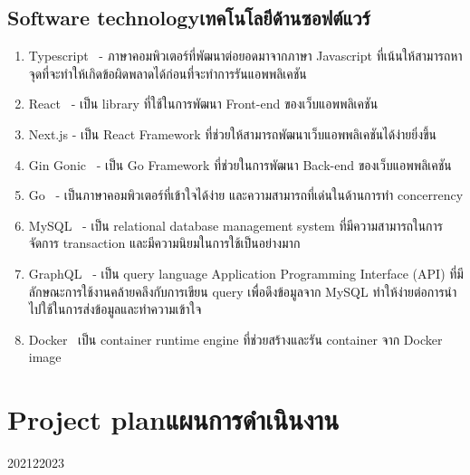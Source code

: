 \subsection{\ifenglish Software technology\else เทคโนโลยีด้านซอฟต์แวร์\fi}
\begin{enumerate}
    \item Typescript~\cite{typescript} - ภาษาคอมพิวเตอร์ที่พัฒนาต่อยอดมาจากภาษา Javascript 
        ที่เน้นให้สามารถหาจุดที่จะทำให้เกิดข้อผิดพลาดได้ก่อนที่จะทำการรันแอพพลิเคชัน
    \item React~\cite{react} - เป็น library ที่ใช้ในการพัฒนา Front-end ของเว็บแอพพลิเคชัน
    \item Next.js\cite{nextjs} - เป็น React Framework ที่ช่วยให้สามารถพัฒนาเว็บแอพพลิเคชันได้ง่ายยิ่งขึ้น
    \item Gin Gonic~\cite{gingonic} - เป็น Go Framework ที่ช่วยในการพัฒนา Back-end ของเว็บแอพพลิเคชัน
    \item Go~\cite{golang} - เป็นภาษาคอมพิวเตอร์ที่เข้าใจได้ง่าย และความสามารถที่เด่นในด้านการทำ concerrency
    \item MySQL~\cite{mysql} - เป็น relational database management system ที่มีความสามารถในการจัดการ transaction 
        และมีความนิยมในการใช้เป็นอย่างมาก
    \item GraphQL~\cite{graphql} -  เป็น query language Application Programming Interface (API) ที่มีลักษณะการใช้งานคล้ายคลึงกับการเขียน query เพื่อดึงข้อมูลจาก MySQL
    ทำให้ง่ายต่อการนำไปใช้ในการส่งข้อมูลและทำความเข้าใจ
    \item Docker~\cite{dke} เป็น container runtime engine ที่ช่วยสร้างและรัน container จาก Docker image
\end{enumerate}

\section{\ifenglish Project plan\else แผนการดำเนินงาน\fi}
\begin{plan}{12}{2021}{2}{2023}
\end{plan}

